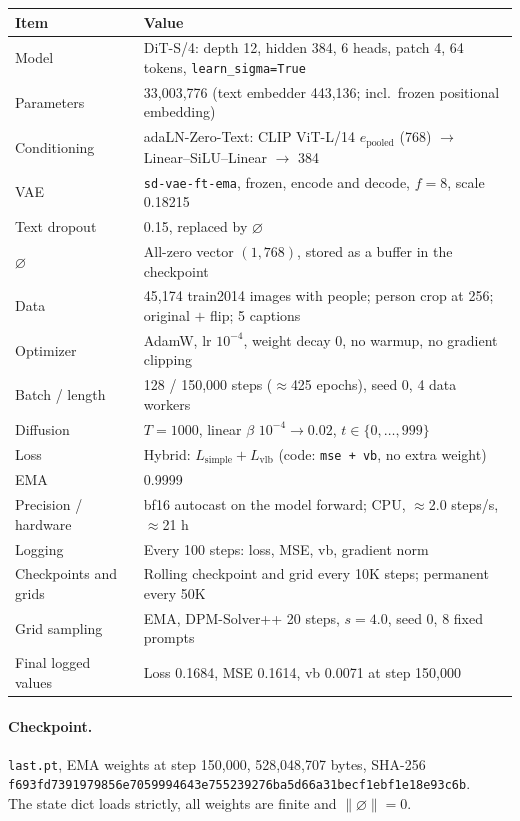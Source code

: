 \documentclass{article}
\newcommand{\nullemb}{\varnothing}
\newcommand{\epooled}{e_{\mathrm{pooled}}}
\begin{document}
\begin{table}[h]
  \centering
  \small
  \begin{tabular}{@{}ll@{}}
    \toprule
    Item & Value \\
    \midrule
    Model & DiT-S/4: depth 12, hidden 384, 6 heads, patch 4, 64 tokens, \texttt{learn\_sigma=True} \\
    Parameters & 33,003,776 (text embedder 443,136; incl.\ frozen positional embedding) \\
    Conditioning & adaLN-Zero-Text: CLIP ViT-L/14 $\epooled$ (768) $\to$ Linear--SiLU--Linear $\to$ 384 \\
    VAE & \texttt{sd-vae-ft-ema}, frozen, encode and decode, $f=8$, scale 0.18215 \\
    Text dropout & 0.15, replaced by $\nullemb$ \\
    $\nullemb$ & All-zero vector $(1,768)$, stored as a buffer in the checkpoint \\
    Data & 45,174 train2014 images with people; person crop at 256; original $+$ flip; 5 captions \\
    Optimizer & AdamW, lr $10^{-4}$, weight decay 0, no warmup, no gradient clipping \\
    Batch / length & 128 / 150,000 steps ($\approx$425 epochs), seed 0, 4 data workers \\
    Diffusion & $T=1000$, linear $\beta$ $10^{-4}\to0.02$, $t\in\{0,\dots,999\}$ \\
    Loss & Hybrid: $L_{\mathrm{simple}}+L_{\mathrm{vlb}}$ (code: \texttt{mse + vb}, no extra weight) \\
    EMA & 0.9999 \\
    Precision / hardware & bf16 autocast on the model forward; CPU, $\approx$2.0 steps/s, $\approx$21 h \\
    Logging & Every 100 steps: loss, MSE, vb, gradient norm \\
    Checkpoints and grids & Rolling checkpoint and grid every 10K steps; permanent every 50K \\
    Grid sampling & EMA, DPM-Solver++ 20 steps, $s=4.0$, seed 0, 8 fixed prompts \\
    Final logged values & Loss 0.1684, MSE 0.1614, vb 0.0071 at step 150,000 \\
    \bottomrule
  \end{tabular}
\end{table}

\paragraph{Checkpoint.}
\texttt{last.pt}, EMA weights at step 150,000, 528,048,707 bytes, SHA-256 \\
\texttt{f693fd7391979856e7059994643e755239276ba5d66a31becf1ebf1e18e93c6b}. \\
The state dict loads strictly, all weights are finite and $\|\nullemb\|=0$.
\end{document}

